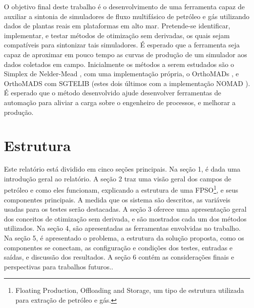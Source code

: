 O objetivo final deste trabalho é o desenvolvimento de uma ferramenta capaz de auxiliar a sintonia de simuladores de fluxo multifásico de petróleo e gás utilizando dados de plantas reais em plataformas em alto mar. 
%
Pretende-se identificar, implementar, e testar métodos de otimização sem derivadas, os quais sejam compatíveis para sintonizar tais simuladores.
%
É esperado que a ferramenta seja capaz de aproximar em pouco tempo as curvas de produção de um simulador aos dados coletados em campo.
%
Inicialmente os métodos a serem estudados são o Simplex de Nelder-Mead \cite{Singer:2009}, com uma implementação própria, o OrthoMADs \cite{DBLP:journals/siamjo/AbramsonADD09}, e OrthoMADS com SGTELIB (estes dois últimos com a implementação NOMAD \cite{Nomad}).
%
É esperado que o método desenvolvido ajude desenvolver ferramentas de automação para aliviar a carga sobre o engenheiro de processos, e melhorar a produção.
%

%
\section{Estrutura}

Este relatório está dividido em cinco seções principais.
%
Na seção 1, é dada uma introdução geral ao relatório.
%
A seção 2 traz uma visão geral dos campos de petróleo e como eles funcionam, explicando a estrutura de uma FPSO\footnote{Floating Production, Offloading and Storage, um tipo de estrutura utilizada para extração de petróleo e gás.}, e seus componentes principais. 
%
A medida que os sistema são descritos, as variáveis usadas para os testes serão destacadas.
%
A seção 3 oferece uma apresentação geral dos conceitos de otimização sem derivada, e são mostrados cada um dos métodos utilizados.
%
Na seção 4, são apresentadas as ferramentas envolvidas no trabalho.
%
Na seção 5, é apresentado o problema, a estrutura da solução proposta, como os componentes se conectam, as configuração e condições dos testes, entradas e saídas, e discussão dos resultados.
%
A seção 6 contém as considerações finais e perspectivas para trabalhos futuros..

 

